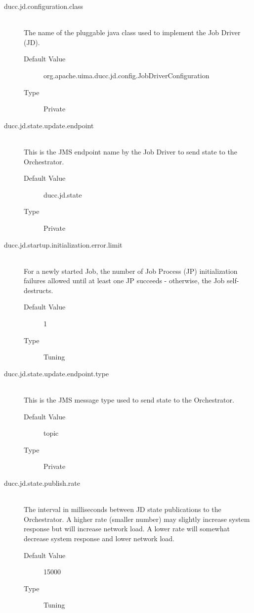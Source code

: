     \begin{description}
        \item[ducc.jd.configuration.class] \hfill \\
          The name of the pluggable java class used to implement the Job Driver (JD). 
          \begin{description}
            \item[Default Value] org.apache.uima.ducc.jd.config.JobDriverConfiguration 
            \item[Type] Private 
          \end{description}
          
        \item[ducc.jd.state.update.endpoint] \hfill \\
          This is the JMS endpoint name by the Job Driver to send state to the Orchestrator. 
          \begin{description}
            \item[Default Value] ducc.jd.state               
            \item[Type] Private 
          \end{description}
            
        \item[ducc.jd.startup.initialization.error.limit] \hfill \\
          For a newly started Job, the number of Job Process (JP) initialization failures
          allowed until at least one JP succeeds - otherwise, the Job self-destructs.
          \begin{description}
            \item[Default Value] 1     
            \item[Type] Tuning
          \end{description}
            

        \item[ducc.jd.state.update.endpoint.type] \hfill \\
          This is the JMS message type used to send state to the Orchestrator. 
          \begin{description}            
            \item[Default Value] topic 
            \item[Type] Private 
          \end{description}
          

        \item[ducc.jd.state.publish.rate] \hfill \\
          The interval in milliseconds between JD state publications to the Orchestrator.
          A higher rate (smaller number)
          may slightly increase system response but will increase network load. A lower rate will 
          somewhat decrease system response and lower network load. 
          \begin{description}
            \item[Default Value] 15000 
            \item[Type] Tuning 
          \end{description}


\end{description}
